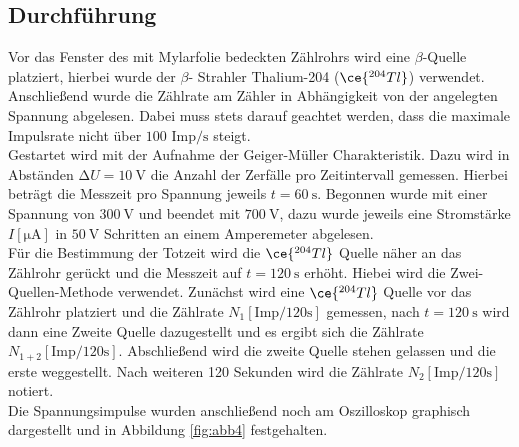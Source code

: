 \subsection{Durchführung}
Vor das Fenster des mit Mylarfolie bedeckten Zählrohrs wird eine $\beta$-Quelle platziert, hierbei wurde der $\beta$- Strahler Thalium-204 ($\ce{^{204}_{}Tl}$) verwendet. Anschließend wurde die Zählrate
am Zähler in Abhängigkeit von der angelegten Spannung abgelesen. Dabei muss stets darauf geachtet werden, dass die maximale Impulsrate nicht über $100$ $\text{Imp}/{\si{\second}}$ steigt. %
\newline
\\
Gestartet wird mit der Aufnahme der Geiger-Müller Charakteristik. Dazu wird in Abständen $\increment U = \SI{10}{\volt}$ die Anzahl der Zerfälle pro Zeitintervall gemessen. Hierbei beträgt die
Messzeit pro Spannung jeweils $t = \SI{60}{\second}$.
Begonnen wurde mit einer Spannung
von $\SI{300}{\volt}$ und beendet mit $\SI{700}{\volt}$, dazu wurde jeweils eine Stromstärke $I [\si{\micro\ampere}]$ in $\SI{50}{\volt}$ Schritten an einem Amperemeter abgelesen. 
\newline
\\
Für die Bestimmung der Totzeit wird die $\ce{^{204}_{}Tl}$ Quelle näher an das Zählrohr gerückt und die Messzeit auf $t = \SI{120}{\second}$ erhöht. Hiebei wird die Zwei-Quellen-Methode %
verwendet. Zunächst wird eine $\ce{^{204}_{}Tl}$ Quelle vor das Zählrohr platziert und die Zählrate $N_{1} [\text{Imp}/120{\si{\second}}]$ gemessen, nach $t = \SI{120}{\second}$ wird dann eine Zweite Quelle 
dazugestellt und es ergibt sich die Zählrate $N_{1+2} [\text{Imp}/120{\si{\second}}]$. Abschließend wird die zweite Quelle stehen gelassen und die erste weggestellt. Nach weiteren 120 Sekunden wird
die Zählrate  $N_{2} [\text{Imp}/120{\si{\second}}]$ notiert.
\newline
\\
Die Spannungsimpulse wurden anschließend noch am Oszilloskop graphisch dargestellt und in Abbildung \ref{fig:abb4} festgehalten.